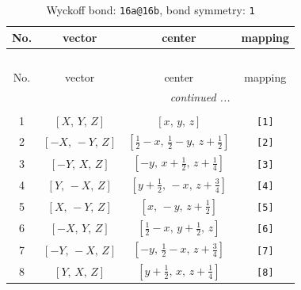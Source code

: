 \documentclass[fleqn,8pt]{jsarticle}
\begin{document}
\begin{longtable}{cccc}
\caption{Wyckoff bond: {\tt 16a@16b}, bond symmetry: {\tt 1}}
 \\
 \hline \hline
No. & vector & center & mapping \\ \hline \endfirsthead

\multicolumn{3}{l}{\tablename\ \thetable{}} \\
 \hline \hline
No. & vector & center & mapping \\ \hline \endhead

 \hline \hline
\multicolumn{3}{r}{\footnotesize\it continued ...} \\ \endfoot

 \hline \hline
\multicolumn{3}{r}{} \\ \endlastfoot

1 & $\left[ X,\, Y,\, Z \right]$ & $\left[ x,\, y,\, z \right]$ & {\tt [1]} \\ \hline
2 & $\left[ - X,\, - Y,\, Z \right]$ & $\left[ \frac{1}{2} - x,\, \frac{1}{2} - y,\, z + \frac{1}{2} \right]$ & {\tt [2]} \\ \hline
3 & $\left[ - Y,\, X,\, Z \right]$ & $\left[ - y,\, x + \frac{1}{2},\, z + \frac{1}{4} \right]$ & {\tt [3]} \\ \hline
4 & $\left[ Y,\, - X,\, Z \right]$ & $\left[ y + \frac{1}{2},\, - x,\, z + \frac{3}{4} \right]$ & {\tt [4]} \\ \hline
5 & $\left[ X,\, - Y,\, Z \right]$ & $\left[ x,\, - y,\, z + \frac{1}{2} \right]$ & {\tt [5]} \\ \hline
6 & $\left[ - X,\, Y,\, Z \right]$ & $\left[ \frac{1}{2} - x,\, y + \frac{1}{2},\, z \right]$ & {\tt [6]} \\ \hline
7 & $\left[ - Y,\, - X,\, Z \right]$ & $\left[ - y,\, \frac{1}{2} - x,\, z + \frac{3}{4} \right]$ & {\tt [7]} \\ \hline
8 & $\left[ Y,\, X,\, Z \right]$ & $\left[ y + \frac{1}{2},\, x,\, z + \frac{1}{4} \right]$ & {\tt [8]} \\
\end{longtable}
\end{document}
